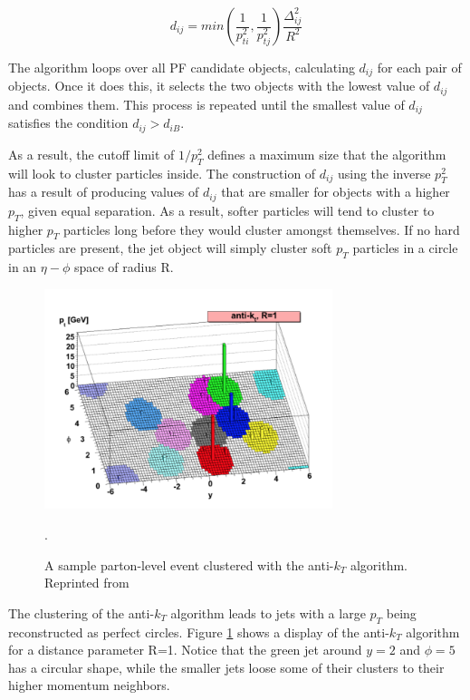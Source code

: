 \begin{equation}
d_{ij} = min(\frac{1}{p_{ti}^{2}},\frac{1}{p_{tj}^{2}})\frac{\Delta_{ij}^{2}}{R^{2}}
\end{equation}

The algorithm loops over all PF candidate objects, calculating $d_{ij}$ for each pair of objects. Once it does this, it selects the two objects with the lowest value of $d_{ij}$ and combines them. This process is repeated until the smallest value of $d_{ij}$ satisfies the condition $d_{ij}>d_{iB}$.

As a result, the cutoff limit of $1/p_{T}^{2}$ defines a maximum size that the algorithm will look to cluster particles inside. The construction of $d_{ij}$ using the inverse $p_{T}^{2}$ has a result of producing values of $d_{ij}$ that are smaller for objects with a higher $p_{T}$, given equal separation. As a result, softer particles will tend to cluster to higher $p_{T}$ particles long before they would cluster amongst themselves. If no hard particles are present, the jet object will simply cluster soft $p_{T}$ particles in a circle in an $\eta-\phi$ space of radius R.

\begin{figure}[h]
 	\centering
 	\includegraphics[width=0.75\textwidth]{figures/antikt.png}
 	\singlespace
 	\caption{A sample parton-level event clustered with the anti-$k_{T}$ algorithm. Reprinted from \cite{Cacciari:2008gp}}.
  	\label{fig:antikt} 	
\end{figure}

The clustering of the anti-$k_{T}$ algorithm leads to jets with a large $p_{T}$ being reconstructed as perfect circles. Figure \ref{fig:antikt} shows a display of the anti-$k_{T}$ algorithm for a distance parameter R=1. Notice that the green jet around $y=2$ and $\phi=5$ has a circular shape, while the smaller jets loose some of their clusters to their higher momentum neighbors.

